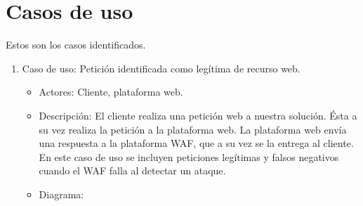 \section{Casos de uso}
\par Estos son los casos identificados.
\begin{enumerate}
  \item Caso de uso: Petición identificada como legítima de recurso web.
    \begin{itemize}
      \item Actores: Cliente, plataforma web.
      \item Descripción: El cliente realiza una petición web a nuestra solución. Ésta a su vez realiza la petición a la plataforma web. La
        plataforma web envía una respuesta a la plataforma WAF, que a su vez se la entrega al cliente. En este caso de uso se incluyen peticiones
        legítimas y falsos negativos cuando el WAF falla al detectar un ataque.
      \item Diagrama:
        \begin{center}
          \label{fig:CasoUso1}

\end{center}
\end{itemize}
\end{enumerate}
